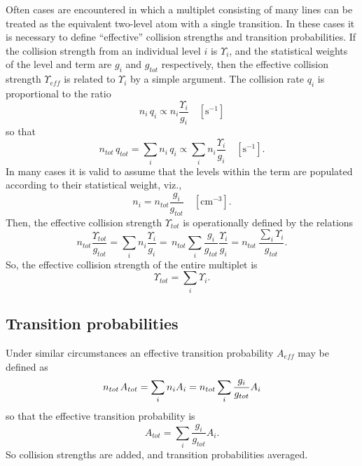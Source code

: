 Often cases are encountered in which a multiplet consisting of many lines
can be treated as the equivalent two-level atom with a single transition.
In these cases it is necessary to define ``effective'' collision strengths
and transition probabilities.
If the collision strength from an individual
level $i$ is ${\Upsilon _i}$, and the statistical weights of the level and term are $g_i$ and $g_{tot}$
respectively, then the effective collision strength ${\Upsilon _{eff}}$
is related to ${\Upsilon _i}$  by a simple argument.
The collision rate
$q_i$ is proportional to the ratio
\begin{equation}
{n_i}\,{q_i} \propto {n_i}\frac{{{\Upsilon _i}}}{{{g_i}}}\quad
  [\mathrm{s}^{-1}]
\end{equation}
so that
\begin{equation}
{n_{tot}}\,{q_{tot}} = \sum\limits_i {{n_i}\,{q_i}}  \propto \sum\limits_i
{{n_i}\frac{{{\Upsilon _i}}}{{{g_i}}}}\quad
  [\mathrm{s}^{-1}].
\end{equation}
In many cases it is valid to assume that the levels within the term are
populated according to their statistical weight, viz.,
\begin{equation}
{n_i} = {n_{tot}}\frac{{{g_i}}}{{{g_{tot}}}}
\quad  [\mathrm{cm}^{-3}].
\end{equation}
Then, the effective collision strength ${\Upsilon _{tot}}$
is operationally defined by the relations
\begin{equation}
{n_{tot}}\frac{{{\Upsilon _{tot}}}}{{{g_{tot}}}} = \sum\limits_i
{{n_i}\frac{{{\Upsilon _i}}}{{{g_i}}} = \,} {n_{tot}}\sum\limits_i
{\frac{{{g_i}}}{{{g_{tot}}}}\frac{{{\Upsilon _i}}}{{{g_i}}}}  =
{n_{tot}}\,\frac{{\sum\limits_i {{\Upsilon _i}} }}{{{g_{tot}}}}.
\end{equation}
So, the effective collision strength of the entire multiplet is
\begin{equation}
{\Upsilon _{tot}} = \sum\limits_i {{\Upsilon _i}}.
\end{equation}

\subsection{Transition probabilities }

Under similar circumstances an effective transition probability
$A_{eff}$ may be defined as
\begin{equation}
{n_{tot}}{\kern 1pt} {A_{tot}} = \sum\limits_i {{n_i}{A_i}}  =
{n_{tot}}\sum\limits_i {\frac{{{g_i}}}{{{g_{tot}}}}{A_i}}
\end{equation}
so that the effective transition probability is
\begin{equation}
{A_{tot}} = \sum\limits_i {\frac{{{g_i}}}{{{g_{tot}}}}{A_i}}.
\end{equation}
So collision strengths are added, and transition probabilities averaged.

